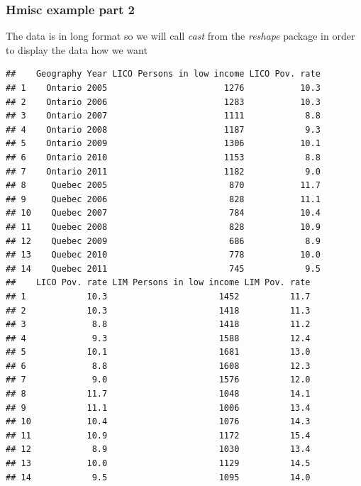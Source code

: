 \documentclass[nogin]{beamer}\usepackage[]{graphicx}\usepackage[]{color}
\makeatletter
\newenvironment{kframe}{%
 \def\at@end@of@kframe{}%
 \ifinner\ifhmode%
  \def\at@end@of@kframe{\end{minipage}}%
  \begin{minipage}{\columnwidth}%
 \fi\fi%
 \def\FrameCommand##1{\hskip\@totalleftmargin \hskip-\fboxsep
 \colorbox{shadecolor}{##1}\hskip-\fboxsep
     \hskip-\linewidth \hskip-\@totalleftmargin \hskip\columnwidth}%
 \MakeFramed {\advance\hsize-\width
   \@totalleftmargin\z@ \linewidth\hsize
   \@setminipage}}%
 {\par\unskip\endMakeFramed%
 \at@end@of@kframe}
\newenvironment{knitrout}{}{} %
\makeatother
\begin{document}
\begin{frame}
\frametitle{Hmisc example part 2}
\small
The data is in long format so we will call \emph{cast} from the \emph{reshape} package in order to display the data how we want
\begin{knitrout}\tiny
{}\color{fgcolor}\begin{kframe}
\begin{verbatim}
##    Geography Year LICO Persons in low income LICO Pov. rate
## 1    Ontario 2005                       1276           10.3
## 2    Ontario 2006                       1283           10.3
## 3    Ontario 2007                       1111            8.8
## 4    Ontario 2008                       1187            9.3
## 5    Ontario 2009                       1306           10.1
## 6    Ontario 2010                       1153            8.8
## 7    Ontario 2011                       1182            9.0
## 8     Quebec 2005                        870           11.7
## 9     Quebec 2006                        828           11.1
## 10    Quebec 2007                        784           10.4
## 11    Quebec 2008                        828           10.9
## 12    Quebec 2009                        686            8.9
## 13    Quebec 2010                        778           10.0
## 14    Quebec 2011                        745            9.5
##    LICO Pov. rate LIM Persons in low income LIM Pov. rate
## 1            10.3                      1452          11.7
## 2            10.3                      1418          11.3
## 3             8.8                      1418          11.2
## 4             9.3                      1588          12.4
## 5            10.1                      1681          13.0
## 6             8.8                      1608          12.3
## 7             9.0                      1576          12.0
## 8            11.7                      1048          14.1
## 9            11.1                      1006          13.4
## 10           10.4                      1076          14.3
## 11           10.9                      1172          15.4
## 12            8.9                      1030          13.4
## 13           10.0                      1129          14.5
## 14            9.5                      1095          14.0
\end{verbatim}
\end{kframe}
\end{knitrout}

\end{frame}
\end{document}
